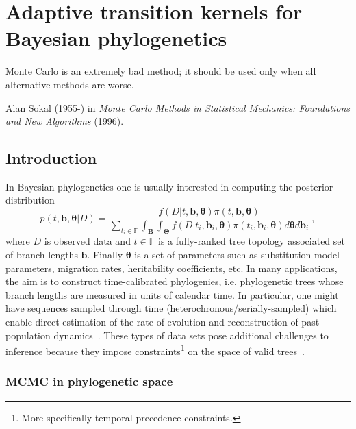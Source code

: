 \chapter{Adaptive transition kernels for Bayesian phylogenetics}
\epigraph{ 
Monte Carlo is an extremely bad method; it should be used only when all alternative methods are worse.
}{Alan Sokal (1955-) in \textit{Monte Carlo Methods in Statistical Mechanics: Foundations and New Algorithms} (1996).}


\section{Introduction}	
\label{sec:intro_ch2}

In Bayesian phylogenetics one is usually interested in computing the posterior distribution
\begin{equation}
\label{eq:posterior}
 p(t, \boldsymbol b, \boldsymbol \theta | D) = \frac{f(D | t, \boldsymbol b, \boldsymbol \theta ) \pi(t, \boldsymbol b, \boldsymbol \theta )}{\sum_{t_i \in \mathbb{F}} \int_{\boldsymbol B}\int_{\boldsymbol \Theta} f(D | t_i, \boldsymbol b_i, \boldsymbol \theta ) \pi(t_i, \boldsymbol b_i, \boldsymbol \theta ) d\boldsymbol\theta d\boldsymbol b_i}\:,
\end{equation}
where $D$ is observed data and $t \in \mathbb{F}$ is a fully-ranked tree topology associated set of branch lengths $\boldsymbol b$. %
Finally $\boldsymbol \theta$ is a set of parameters such as substitution model parameters, migration rates, heritability coefficients, etc.
In many applications, the aim is to construct time-calibrated phylogenies, i.e. phylogenetic trees whose branch lengths are measured in units of calendar time.
In particular, one might have sequences sampled through time (heterochronous/serially-sampled) which enable direct estimation of the rate of evolution and reconstruction of past population dynamics~\citep{Drummond2002, Drummond2005}.
These types of data sets pose additional challenges to inference because they impose constraints\footnote{More specifically temporal precedence constraints.} on the space of valid trees~\citep{Stadler2013}.

\subsection{MCMC in phylogenetic space}
\label{sec:tree_mcmc}

